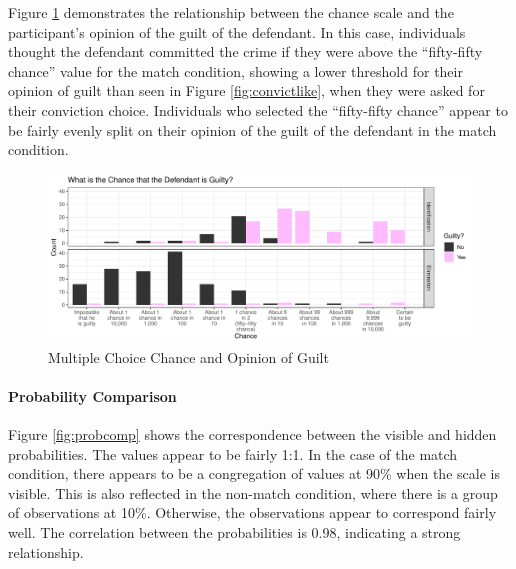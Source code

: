 \documentclass[print]{nuthesis}
\begin{document}
Figure \ref{fig:opinionlike} demonstrates the relationship between the chance scale and the participant's opinion of the guilt of the defendant.
In this case, individuals thought the defendant committed the crime if they were above the ``fifty-fifty chance'' value for the match condition, showing a lower threshold for their opinion of guilt than seen in Figure \ref{fig:convictlike}, when they were asked for their conviction choice.
Individuals who selected the ``fifty-fifty chance'' appear to be fairly evenly split on their opinion of the guilt of the defendant in the match condition.

\begin{figure}

{\centering \includegraphics[width=\linewidth]{thesis_files/figure-latex/opinionlike-1} 

}

\caption{Multiple Choice Chance and Opinion of Guilt}\label{fig:opinionlike}
\end{figure}

\hypertarget{probability-comparison}{%
\paragraph{Probability Comparison}\label{probability-comparison}}

Figure \ref{fig:probcomp} shows the correspondence between the visible and hidden probabilities.
The values appear to be fairly 1:1.
In the case of the match condition, there appears to be a congregation of values at 90\% when the scale is visible.
This is also reflected in the non-match condition, where there is a group of observations at 10\%.
Otherwise, the observations appear to correspond fairly well.
The correlation between the probabilities is 0.98, indicating a strong relationship.
\end{document}
